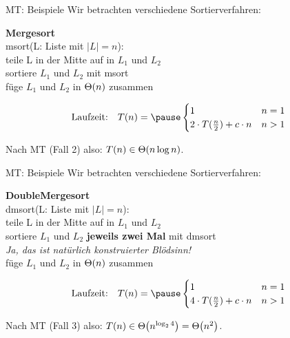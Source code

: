 \begin{frame}[t]{MT: Beispiele}  %
	Wir betrachten verschiedene Sortierverfahren: \\
	\bigskip
	
	\textbf{Mergesort}\\
	msort(L: Liste mit $|L| = n$):\\
	\quad	teile L in der Mitte auf in $L_1$ und $L_2$\\
	\quad	sortiere $L_1$ und $L_2$ mit msort \\
	\quad 	füge $L_1$ und $L_2$ in $\Theta\!\left(n\right)$ zusammen\\
	\medskip
	
	$$\text{Laufzeit:} \quad T(n) = \pause \begin{cases}
	1 & n = 1\\
	2 \cdot T(\fract n/2 ) + c \cdot n & n > 1
	\end{cases}$$
	
	\pause
	Nach MT (Fall 2) also: $T(n) \in \Theta\!\left(n \log n\right)$.
\end{frame}

\begin{frame}[t]{MT: Beispiele}
	Wir betrachten verschiedene Sortierverfahren:\\
	\bigskip
	
	\textbf{DoubleMergesort}\\
	dmsort(L: Liste mit $|L| = n$):\\
	\quad teile L in der Mitte auf in $L_1$ und $L_2$\\
	\quad sortiere $L_1$ und $L_2$ \textbf{jeweils zwei Mal} mit dmsort\\
	\qquad \textit{Ja, das ist natürlich konstruierter Blödsinn!}\\
	\quad füge $L_1$ und $L_2$ in $\Theta\!\left(n\right)$ zusammen\\
	\medskip
	
	$$\text{Laufzeit:} \quad T(n) = \pause \begin{cases}
	1 & n = 1\\
	4 \cdot T(\fract n/2 ) + c \cdot n  & n > 1
	\end{cases}$$
	
	\pause
	Nach MT (Fall 3) also: $T(n) \in \Theta\!\left(n^{\log_2 4}\right) = \Theta\!\left(n^2\right)$.
\end{frame}

